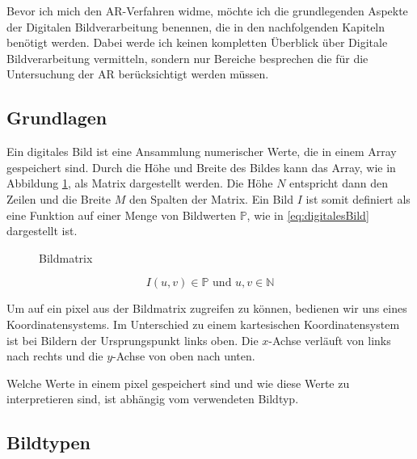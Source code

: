 Bevor ich mich den \gls{AR}-Verfahren widme, möchte ich die grundlegenden Aspekte der Digitalen Bildverarbeitung benennen, die in den nachfolgenden Kapiteln benötigt werden. Dabei werde ich keinen kompletten Überblick über Digitale Bildverarbeitung vermitteln, sondern nur Bereiche besprechen die für die Untersuchung der \gls{AR} berücksichtigt werden müssen.


\subsection{Grundlagen} %
\label{sub:grundlagen}

Ein digitales Bild ist eine Ansammlung numerischer Werte, die in einem Array gespeichert sind. Durch die Höhe und Breite des Bildes kann das Array, wie in Abbildung \ref{fig:bildmatrix}, als Matrix dargestellt werden. Die Höhe $N$ entspricht dann den Zeilen und die Breite $M$ den Spalten der Matrix. Ein Bild $I$ ist somit definiert als eine Funktion auf einer Menge von Bildwerten $\mathbb{P}$, wie in \ref{eq:digitalesBild} dargestellt ist.

\begin{figure}
	\centering
	\def\svgwidth{.5\columnwidth}
	
	\caption{Bildmatrix}
	\label{fig:bildmatrix}
\end{figure}

\begin{equation}
	I\left(u,v\right)\in\mathbb{P} \text{ und } u,v\in\mathbb{N}
	\label{eq:digitalesBild}
\end{equation}

Um auf ein \gls{pixel} aus der Bildmatrix zugreifen zu können, bedienen wir uns eines Koordinatensystems. Im Unterschied zu einem kartesischen Koordinatensystem ist bei Bildern der Ursprungspunkt links oben. Die \(x\)-Achse verläuft von links nach rechts und die \(y\)-Achse von oben nach unten. \begin{comment}\\TODO:vgl abbildung\end{comment} Welche Werte in einem \gls{pixel} gespeichert sind und wie diese Werte zu interpretieren sind, ist abhängig vom verwendeten Bildtyp.


\subsection{Bildtypen} %
\label{sub:bildtypen}

